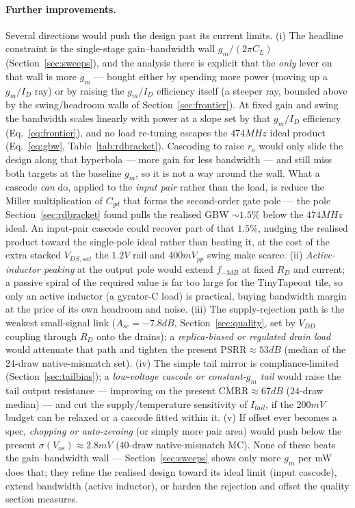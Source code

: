 \documentclass{article}
\begin{document}
\paragraph{Further improvements.} Several directions would push the design past its
current limits. (i) The headline constraint is the single-stage gain--bandwidth wall
$g_m/(2\pi C_L)$ (Section~\ref{sec:sweeps}), and the analysis there is explicit that the
\emph{only} lever on that wall is more $g_m$ --- bought either by spending more power
(moving up a $g_m/I_D$ ray) or by raising the $g_m/I_D$ efficiency itself (a steeper ray,
bounded above by the swing/headroom walls of Section~\ref{sec:frontier}). At fixed gain
and swing the bandwidth scales linearly with power at a slope set by that $g_m/I_D$
efficiency (Eq.~\eqref{eq:frontier}), and no load re-tuning escapes the $474MHz$ ideal
product (Eq.~\eqref{eq:gbw}, Table~\ref{tab:rdbracket}). Cascoding to raise $r_o$ would only slide
the design along that hyperbola --- more gain for less bandwidth --- and still miss both
targets at the baseline $g_m$, so it is not a way around the wall. What a cascode
\emph{can} do, applied to the \emph{input pair} rather than the load, is reduce the Miller
multiplication of $C_{gd}$ that forms the second-order gate pole --- the pole
Section~\ref{sec:rdbracket} found pulls the realised GBW $\sim1.5\%$ below the $474MHz$
ideal. An input-pair cascode could recover part of that $1.5\%$, nudging the realised
product toward the single-pole ideal rather than beating it, at the cost of the extra
stacked $V_{DS,sat}$ the $1.2V$ rail and $400mV_{pp}$ swing make scarce. (ii)
\emph{Active-inductor peaking} at the output pole would extend $f_{-3dB}$ at fixed $R_D$
and current; a passive spiral of the required value is far too large for the TinyTapeout
tile, so only an active inductor (a gyrator-C load) is practical, buying bandwidth margin
at the price of its own headroom and noise. (iii) The supply-rejection path is the weakest
small-signal link ($A_{sc}=-7.8dB$, Section~\ref{sec:quality}, set by $V_{DD}$ coupling
through $R_D$ onto the drains); a \emph{replica-biased or regulated drain load} would
attenuate that path and tighten the present $\text{PSRR}\approx53dB$ (median of the
$24$-draw native-mismatch set). (iv) The simple tail mirror is compliance-limited
(Section~\ref{sec:tailbias}); a \emph{low-voltage cascode or constant-$g_m$ tail} would
raise the tail output resistance --- improving on the present $\text{CMRR}\approx67dB$
($24$-draw median) --- and cut the supply/temperature sensitivity of $I_{tail}$, if the
$200mV$ budget can be relaxed or a cascode fitted within it. (v) If offset ever becomes a
spec, \emph{chopping or auto-zeroing} (or simply more pair area) would push below the
present $\sigma(V_{os})\approx2.8mV$ ($40$-draw native-mismatch MC). None of these beats
the gain--bandwidth wall --- Section~\ref{sec:sweeps} shows only more $g_m$ per mW does
that; they refine the realised design toward its ideal limit (input cascode), extend
bandwidth (active inductor), or harden the rejection and offset the quality section
measures.



\end{document}
